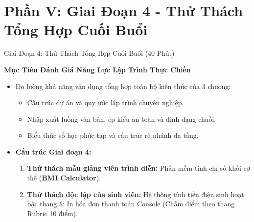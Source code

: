 \documentclass[aspectratio=169, 10pt]{beamer}
\begin{document}
\section{Phần V: Giai Đoạn 4 - Thử Thách Tổng Hợp Cuối Buổi}

\begin{frame}{Giai Đoạn 4: Thử Thách Tổng Hợp Cuối Buổi (40 Phút)}
  \begin{block}{\textbf{Mục Tiêu Đánh Giá Năng Lực Lập Trình Thực Chiến}}
    \begin{itemize}
      \item Đo lường khả năng vận dụng tổng hợp toàn bộ kiến thức của 3 chương:
        \begin{itemize}
          \item Cấu trúc dự án và quy ước lập trình chuyên nghiệp.
          \item Nhập xuất luồng văn bản, ép kiểu an toàn và định dạng chuỗi.
          \item Biểu thức số học phức tạp và cấu trúc rẽ nhánh đa tầng.
        \end{itemize}
      \item \textbf{Cấu trúc Giai đoạn 4:}
        \begin{enumerate}
          \item \textbf{Thử thách mẫu giảng viên trình diễn:} Phần mềm tính chỉ số khối cơ thể (\textbf{BMI Calculator}).
          \item \textbf{Thử thách độc lập của sinh viên:} Hệ thống tính tiền điện sinh hoạt bậc thang \& In hóa đơn thanh toán Console (Chấm điểm theo thang Rubric 10 điểm).
        \end{enumerate}
    \end{itemize}
  \end{block}
\end{frame}
\end{document}
